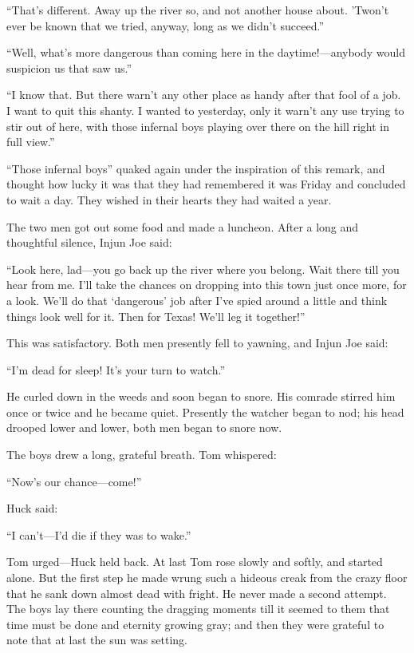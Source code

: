 \documentclass{book}
\begin{document}
“That’s different. Away up the river so, and not another house about. ’Twon’t ever be known that we tried, anyway, long as we didn’t succeed.”

“Well, what’s more dangerous than coming here in the daytime!—anybody would suspicion us that saw us.”

“I know that. But there warn’t any other place as handy after that fool of a job. I want to quit this shanty. I wanted to yesterday, only it warn’t any use trying to stir out of here, with those infernal boys playing over there on the hill right in full view.”

“Those infernal boys” quaked again under the inspiration of this remark, and thought how lucky it was that they had remembered it was Friday and concluded to wait a day. They wished in their hearts they had waited a year.

The two men got out some food and made a luncheon. After a long and thoughtful silence, Injun Joe said:

“Look here, lad—you go back up the river where you belong. Wait there till you hear from me. I’ll take the chances on dropping into this town just once more, for a look. We’ll do that ‘dangerous’ job after I’ve spied around a little and think things look well for it. Then for Texas! We’ll leg it together!”

This was satisfactory. Both men presently fell to yawning, and Injun Joe said:

“I’m dead for sleep! It’s your turn to watch.”

He curled down in the weeds and soon began to snore. His comrade stirred him once or twice and he became quiet. Presently the watcher began to nod; his head drooped lower and lower, both men began to snore now.

The boys drew a long, grateful breath. Tom whispered:

“Now’s our chance—come!”

Huck said:

“I can’t—I’d die if they was to wake.”

Tom urged—Huck held back. At last Tom rose slowly and softly, and started alone. But the first step he made wrung such a hideous creak from the crazy floor that he sank down almost dead with fright. He never made a second attempt. The boys lay there counting the dragging moments till it seemed to them that time must be done and eternity growing gray; and then they were grateful to note that at last the sun was setting.
\end{document}
